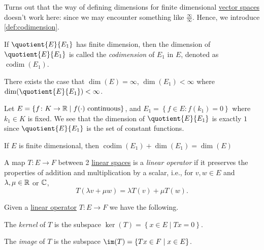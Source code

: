 Turns out that the way of defining dimensions for finite dimensional \hyperref[def:linear-vector-space]{vector spaces} doesn't work here: since we may encounter something like \(\frac{\infty}{\infty }\). Hence, we introduce \autoref{def:codimension}.

\begin{definition}[Codimension]\label{def:codimension}
	If \(\quotient{E}{E_1} \) has finite dimension, then the dimension of \(\quotient{E}{E_1} \) is called the \emph{codimension} of \(E_1\) in \(E\), denoted as \(\mathop{\mathrm{codim}}(E_1)\).
\end{definition}

\begin{eg}
	There exists the case that \(\dim(E) = \infty \), \(\dim(E_1) < \infty\) where \(\dim(\quotient{E}{E_1} )<\infty \).
\end{eg}
\begin{explanation}
	Let \(E = \left\{ f\colon K\to \mathbb{\MakeUppercase{r}} \mid f(\cdot) \text{ continuous}  \right\} \), and \(E_1 = \left\{ f\in E\colon f(k_1) = 0 \right\} \) where \(k_1\in K\) is fixed. We see that the dimension of \(\quotient{E}{E_1} \) is exactly \(1\) since \(\quotient{E}{E_1} \) is the set of constant functions.
\end{explanation}

\begin{theorem}
	If \(E\) is finite dimensional, then \(\mathop{\mathrm{codim}}(E_1) + \dim (E_1) = \dim(E)\)
\end{theorem}

\begin{definition}\label{def:linear-operator}
	A map \(T\colon E\to F\) between 2 \hyperref[def:linear-vector-space]{linear spaces} is a \emph{linear operator} if it preserves the properties of addition and multiplication by a scalar, i.e., for \(v, w\in E\) and \(\lambda , \mu \in \mathbb{\MakeUppercase{r}}\) or \(\mathbb{\MakeUppercase{c}}\),
	\[
		T(\lambda v + \mu w) = \lambda T(v) + \mu T(w).
	\]
\end{definition}

\begin{definition*}
	Given a \hyperref[def:linear-operator]{linear operator} \(T\colon E \to F\) we have the following.
	\begin{definition}[Kernel]
		The \emph{kernel} of \(T\) is the subspace \(\ker(T) = \left\{ x\in E\mid Tx=0 \right\} \).
	\end{definition}

	\begin{definition}[Image]
		The \emph{image} of \(T\) is the subspace \(\im(T) = \left\{ Tx\in F\mid x\in E \right\} \).
	\end{definition}
\end{definition*}

